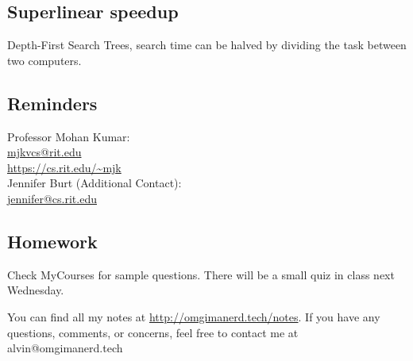 \documentclass[letterpaper, 12pt]{article}
\begin{document}
\subsection*{Superlinear speedup}
Depth-First Search Trees, search time can be halved by dividing the task
between two computers.

\subsection*{Reminders}
Professor Mohan Kumar: \\
\url{mjkvcs@rit.edu} \\
\url{https://cs.rit.edu/~mjk} \\

\noindent Jennifer Burt (Additional Contact): \\
\url{jennifer@cs.rit.edu}

\subsection*{Homework}
Check MyCourses for sample questions. There will be a small quiz in class
next Wednesday.

\begin{center}
  You can find all my notes at \url{http://omgimanerd.tech/notes}. If you have
  any questions, comments, or concerns, feel free to contact me at
  alvin@omgimanerd.tech
\end{center}
\end{document}

